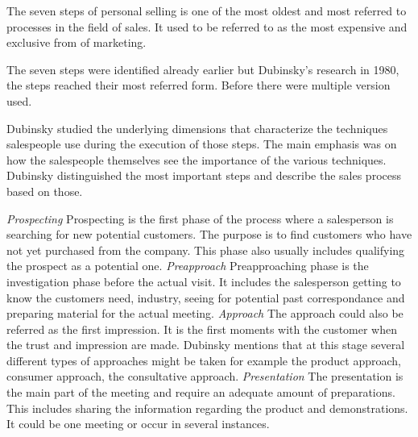 \documentclass[12pt,a4paper,oneside,pdftex]{report}
\begin{document}
The seven steps of personal selling is one of the most oldest and most referred to processes in the field of sales. It used to be referred to as the most expensive and exclusive from of marketing. 

The seven steps were identified already earlier but Dubinsky's research in 1980, the steps reached their most referred form. Before there were multiple version used. 

Dubinsky studied the underlying dimensions that characterize the techniques salespeople use during the execution of those steps. The main emphasis was on how the salespeople themselves see the importance of the various techniques. Dubinsky distinguished the most important steps and describe the sales process based on those. 


\newline \newline \emph{Prospecting}\newline 
Prospecting is the first phase of the process where a salesperson is searching for new potential customers. The purpose is to find customers who have not yet purchased from the company. This phase also usually includes qualifying the prospect as a potential one. \citep{Jobber}\newline \newline
\emph{Preapproach}\newline 
Preapproaching phase is the investigation phase before the actual visit. It includes the salesperson getting to know the customers need, industry, seeing for potential past correspondance and preparing material for the actual meeting. \citep{Moncrief}\newline \newline
\emph{Approach}\newline
The approach could also be referred as the first impression. It is the first moments with the customer when the trust and impression are made. Dubinsky mentions that at this stage several different types of approaches might be taken for example the product approach, consumer approach, the consultative approach. \citep{Dubinsky} \newline \newline
\emph{Presentation}\newline
The presentation is the main part of the meeting and require an adequate amount of preparations. This includes sharing the information regarding the product and demonstrations. It could be one meeting or occur in several instances. \citep{Moncrief}\newline \newline
\end{document}

